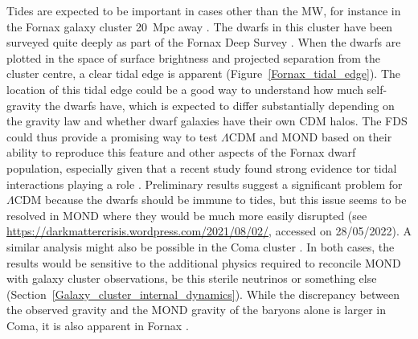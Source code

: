 \documentclass[fleqn,usenatbib,useAMS]{mnras} %
\begin{document}
Tides are expected to be important in cases other than the MW, for instance in the Fornax galaxy cluster 20~Mpc away \citep{Jordan_2007}. The dwarfs in this cluster have been surveyed quite deeply as part of the Fornax Deep Survey \citep[FDS;][]{Venhola_2018}. When the dwarfs are plotted in the space of surface brightness and projected separation from the cluster centre, a clear tidal edge is apparent (Figure~\ref{Fornax_tidal_edge}). The location of this tidal edge could be a good way to understand how much self-gravity the dwarfs have, which is expected to differ substantially depending on the gravity law and whether dwarf galaxies have their own CDM halos. The FDS could thus provide a promising way to test $\Lambda$CDM and MOND based on their ability to reproduce this feature and other aspects of the Fornax dwarf population, especially given that a recent study found strong evidence tor tidal interactions playing a role \citep[see section 7.4 of][]{Venhola_2022}. Preliminary results suggest a significant problem for $\Lambda$CDM because the dwarfs should be immune to tides, but this issue seems to be resolved in MOND where they would be much more easily disrupted (see \href{https://darkmattercrisis.wordpress.com/2021/08/02/}{https://darkmattercrisis.wordpress.com/2021/08/02/}, accessed on 28/05/2022). A similar analysis might also be possible in the Coma cluster \citep{Chilingarian_2019, Freundlich_2021}. In both cases, the results would be sensitive to the additional physics required to reconcile MOND with galaxy cluster observations, be this sterile neutrinos or something else (Section~\ref{Galaxy_cluster_internal_dynamics}). While the discrepancy between the observed gravity and the MOND gravity of the baryons alone is larger in Coma, it is also apparent in Fornax \citep{Samurovic_2016_Fornax}.
\end{document}
